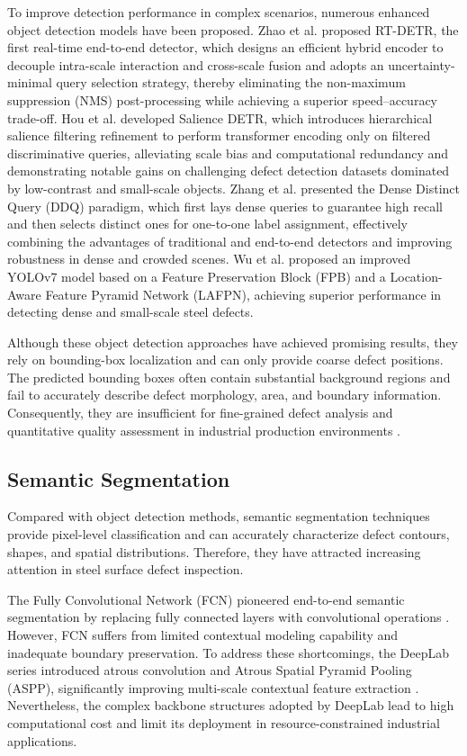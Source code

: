 \documentclass[sn-basic]{sn-jnl}
\theoremstyle{thmstyleone}%
\theoremstyle{thmstyletwo}%
\theoremstyle{thmstylethree}%
\begin{document}
To improve detection performance in complex scenarios, numerous enhanced object detection models have been proposed. Zhao et al. \cite{Zhao2024DETRs} proposed RT-DETR, the first real-time end-to-end detector, which designs an efficient hybrid encoder to decouple intra-scale interaction and cross-scale fusion and adopts an uncertainty-minimal query selection strategy, thereby eliminating the non-maximum suppression (NMS) post-processing while achieving a superior speed–accuracy trade-off. Hou et al. \cite{Hou2024Salience} developed Salience DETR, which introduces hierarchical salience filtering refinement to perform transformer encoding only on filtered discriminative queries, alleviating scale bias and computational redundancy and demonstrating notable gains on challenging defect detection datasets dominated by low-contrast and small-scale objects. Zhang et al. \cite{Zhang2023Dense} presented the Dense Distinct Query (DDQ) paradigm, which first lays dense queries to guarantee high recall and then selects distinct ones for one-to-one label assignment, effectively combining the advantages of traditional and end-to-end detectors and improving robustness in dense and crowded scenes. Wu et al. \cite{Wu2025Efficient} proposed an improved YOLOv7 model based on a Feature Preservation Block (FPB) and a Location-Aware Feature Pyramid Network (LAFPN), achieving superior performance in detecting dense and small-scale steel defects.

Although these object detection approaches have achieved promising results, they rely on bounding-box localization and can only provide coarse defect positions. The predicted bounding boxes often contain substantial background regions and fail to accurately describe defect morphology, area, and boundary information. Consequently, they are insufficient for fine-grained defect analysis and quantitative quality assessment in industrial production environments \cite{Ashrafi2025Steel}.
\subsection{Semantic Segmentation}
Compared with object detection methods, semantic segmentation techniques provide pixel-level classification and can accurately characterize defect contours, shapes, and spatial distributions. Therefore, they have attracted increasing attention in steel surface defect inspection.

The Fully Convolutional Network (FCN) pioneered end-to-end semantic segmentation by replacing fully connected layers with convolutional operations \cite{Long2015Fully}. However, FCN suffers from limited contextual modeling capability and inadequate boundary preservation. To address these shortcomings, the DeepLab series introduced atrous convolution and Atrous Spatial Pyramid Pooling (ASPP), significantly improving multi-scale contextual feature extraction \cite{Chen2018DeepLab}. Nevertheless, the complex backbone structures adopted by DeepLab lead to high computational cost and limit its deployment in resource-constrained industrial applications.
\end{document}
